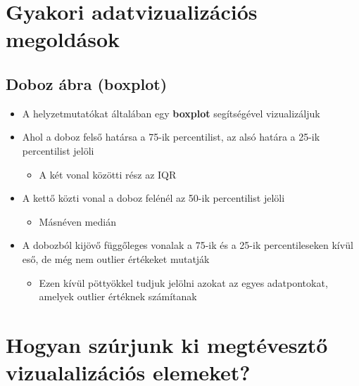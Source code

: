 \documentclass[
  letterpaper,
  DIV=11,
  numbers=noendperiod]{scrreprt}
\providecommand{\tightlist}{%
  \setlength{\itemsep}{0pt}\setlength{\parskip}{0pt}}\usepackage{longtable,booktabs,array}
\begin{document}
\hypertarget{gyakori-adatvizualizuxe1ciuxf3s-megolduxe1sok}{%
\section{Gyakori adatvizualizációs
megoldások}\label{gyakori-adatvizualizuxe1ciuxf3s-megolduxe1sok}}

\hypertarget{doboz-uxe1bra-boxplot}{%
\subsection{Doboz ábra (boxplot)}\label{doboz-uxe1bra-boxplot}}

\begin{itemize}
\item
  A helyzetmutatókat általában egy \textbf{boxplot} segítségével
  vizualizáljuk
\item
  Ahol a doboz felső határsa a 75-ik percentilist, az alsó határa a
  25-ik percentilist jelöli

  \begin{itemize}
  \tightlist
  \item
    A két vonal közötti rész az IQR
  \end{itemize}
\item
  A kettő közti vonal a doboz felénél az 50-ik percentilist jelöli

  \begin{itemize}
  \tightlist
  \item
    Másnéven medián
  \end{itemize}
\item
  A dobozból kijövő függőleges vonalak a 75-ik és a 25-ik
  percentileseken kívül eső, de még nem outlier értékeket mutatják

  \begin{itemize}
  \tightlist
  \item
    Ezen kívül pöttyökkel tudjuk jelölni azokat az egyes adatpontokat,
    amelyek outlier értéknek számítanak
  \end{itemize}
\end{itemize}

\hypertarget{hogyan-szuxfarjunk-ki-megtuxe9vesztux151-vizualalizuxe1ciuxf3s-elemeket}{%
\section{Hogyan szúrjunk ki megtévesztő vizualalizációs
elemeket?}\label{hogyan-szuxfarjunk-ki-megtuxe9vesztux151-vizualalizuxe1ciuxf3s-elemeket}}
\end{document}
